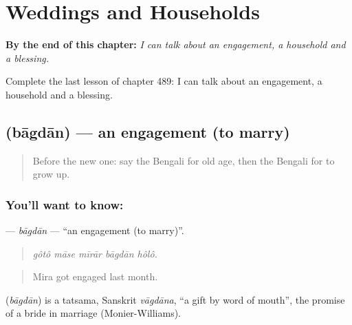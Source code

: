 
\chapter{Weddings and Households}
\label{ch:bn-weddings-and-households}

\begin{chapteropening}
\textbf{By the end of this chapter:} \emph{I can talk about an engagement, a household and a blessing.}

Complete the last lesson of chapter 489: I can talk about an engagement, a household and a blessing.
\end{chapteropening}

\section[\texorpdfstring{\bn{বাগদান} (bāgdān)}{বাগদান (bāgdān)}]{ (bāgdān) — an engagement (to marry)}

\label{lesson:BN-C489-bagdan}



\begin{quote}
Before the new one: say the Bengali for old age, then the Bengali for to grow up.
\end{quote}

\subsection*{You'll want to know: }
\textbf{} — \emph{bāgdān} — \textquotedblleft{}an engagement (to marry)\textquotedblright{}.

\begin{quote}
    
\end{quote}

\begin{quote}
\emph{gôtô māse mīrār bāgdān hôlô.}
\end{quote}

\begin{quote}
Mira got engaged last month.
\end{quote}

\begin{cousinweb}
\textbf{} (\emph{bāgdān}) is a tatsama, Sanskrit \emph{vāgdāna}, \textquotedblleft{}a gift by word of mouth\textquotedblright{}, the promise of a bride in marriage (Monier-Williams).
\end{cousinweb}

